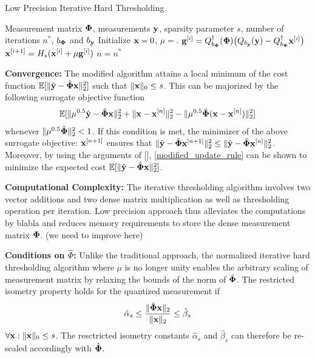 \documentclass{article}
\begin{document}
\begin{algorithm}[h!]
   \caption{Low Precision Iterative Hard Thresholding}
   \label{low_precision_iht}
\begin{algorithmic}
    Measurement matrix ${\bf \Phi}$, measurements ${\bf y}$, sparsity parameter $s$, number of iterations $n^*$, $b_{\bf \Phi}$ and $b_{\bf y}$ 
   \REPEAT
   \STATE Initialize ${\bf x} = 0$, $\mu = $.
   \STATE ${\bf g}^{[i]} = Q^{\dagger}_{b_{\bf \Phi}}({\bf \Phi}) \big(Q_{b_{\bf y}}({\bf y})-Q^{\dagger}_{b_{\bf \Phi}}{\bf x}^{[i]}\big)$
   \STATE ${\bf x}^{[i+1]} = H_s({\bf x}^{[i]} + \mu {\bf g}^{[i]})$
   \ENDFOR
   \UNTIL $n = n^*$
\end{algorithmic}
\end{algorithm}
{\bf Convergence:} The modified algorithm attains a local minimum of the cost function $\mathbb{E} [ \| \hat{\bf y} - \hat{\bf \Phi}{\bf x}\|_2^2]$ such that $\|{\bf x}\|_0 \leq s$. This can be majorized by the following surrogate objective function 
\begin{equation*}
    \begin{split}
        \mathbb{E} [\|\mu^{0.5}\hat{\bf y} -   \hat{\bf \Phi}{\bf x}\|_2^2+ \|{\bf x} 
    - {\bf x}^{[n]} \|_2^2
    - \|\mu^{0.5}\hat{\bf \Phi}({\bf x}- {\bf x}^{[n]}) \|_2^2] 
    \end{split}
\end{equation*}
whenever $\| \mu^{0.5}\hat{\bf \Phi}\|_2^2 <1$. If this condition is met, the minimizer of the above surrogate objective: ${\bf x}^{[n+1]}$ ensures that $\| \hat{\bf y} - \hat{\bf \Phi}{\bf x}^{[n+1]}\|_2^2 \leq \| \hat{\bf y} - \hat{\bf \Phi}{\bf x}^{[n]}\|_2^2$. Moreover, by using the arguments of [], \ref{modified_update_rule} can be shown to minimize the expected cost $\mathbb{E} [ \| \hat{\bf y} - \hat{\bf \Phi}{\bf x}\|_2^2]$.

{\bf Computational Complexity:} The iterative thresholding algorithm involves two vector additions and two dense matrix multiplication as well as thresholding operation per iteration. Low precision approach thus alleviates the computations by blabla and reduces memory requirements to store the dense measurement matrix ${\bf \Phi}$. (we need to improve here)
 
{\bf Conditions on $\hat{\Phi}$:} Unlike the traditional approach, the normalized iterative hard thresholding algorithm where $\mu$ is no longer unity enables the arbitrary scaling of measurement matrix by relaxing the bounds of the norm of $\hat{{\bf \Phi}}$. The restricted isometry property holds for the quantized measurement if
\begin{equation}
    \hat{\alpha}_{s} \leq \frac{\|\hat{{\bf \Phi}} {\bf x}\|_2}{\|{\bf x}\|_2} \leq \hat{\beta}_{s}
\end{equation}
$\forall {\bf x}: \| {\bf x}\|_0 \leq s$. The resctricted isometry constants $\hat{\alpha}_s$ and $\hat{\beta}_s$ can therefore be re-scaled accordingly with $\hat{\bf \Phi}$.
\end{document}

